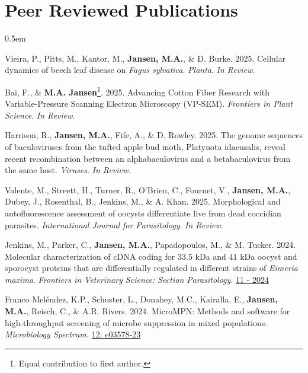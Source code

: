 \documentclass[12pt,a4paper]{article}
\begin{document}
\section*{Peer Reviewed Publications}
\begin{description}
	\itemsep 0.5em
	
	\item  Vieira, P., Pitts, M., Kantor, M., \textbf{Jansen, M.A.}, \& D. Burke. 2025. Cellular dynamics of beech leaf disease on \textit{Fagus sylvatica}. \textit{Planta}. \textit{In Review}.
	
	\item Bai, F., \& \textbf{M.A. Jansen}\footnote[2]{Equal contribution to first author.}. 2025. Advancing Cotton Fiber Research with Variable-Pressure Scanning Electron Microscopy (VP-SEM). \textit{Frontiers in Plant Science}. \textit{In Review}.
	
	\item Harrison, R., \textbf{Jansen, M.A.}, Fife, A., \& D. Rowley. 2025. The genome sequences of baculoviruses from the tufted apple bud moth, Platynota idaeusalis, reveal recent recombination between 
	an alphabaculovirus and a betabaculovirus from the same host. \textit{Viruses}. \textit{In Review}.
	
	\item Valente, M., Streett, H., Turner, R., O’Brien, C., Fournet, V., \textbf{Jansen, M.A.}, Dubey, J., Rosenthal, B., Jenkins, M., \& A. Khan. 2025. Morphological and autofluorescence assessment of oocysts differentiate live from dead coccidian parasites. \textit{International Journal for Parasitology}. \textit{In Review}.
	
	\item Jenkins, M., Parker, C., \textbf{Jansen, M.A.}, Papadopoulos, M., \& M. Tucker. 2024. Molecular characterization of cDNA coding for 33.5 kDa and 41 kDa oocyst and sporocyst proteins that are differentially regulated in different strains of \textit{Eimeria maxima}. \textit{Frontiers in Veterinary Science: Section Parasitology}. \href{https://doi.org/10.3389/fvets.2024.1445646}{11 - 2024}
		
	\item Franco Mel\'{e}ndez, K.P., Schuster, L., Donahey, M.C., Kairalla, E., \textbf{Jansen, M.A.}, Reisch, C., \& A.R. Rivers. 2024. MicroMPN: Methods and software for high-throughput screening of microbe suppression in mixed populations. \textit{Microbiology Spectrum.} \href{https://doi.org/10.1128/spectrum.03578-23}{12: e03578-23}
	

\end{description}
\end{document}

